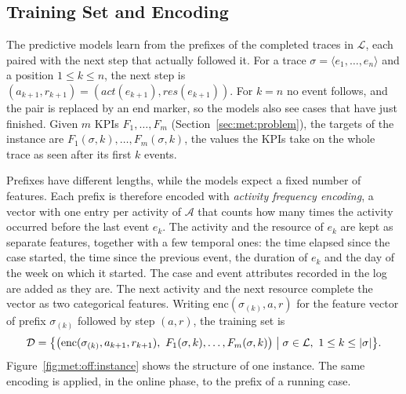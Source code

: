 \subsection{Training Set and Encoding}
\label{subsec:met:offline:training}
The predictive models learn from the prefixes of the completed traces in
$\mathcal{L}$, each paired with the next step that actually followed it. For
a trace $\sigma = \langle e_1, \dots, e_n \rangle$ and a position
$1 \le k \le n$, the next step is $(a_{k+1}, r_{k+1}) = (act(e_{k+1}),
res(e_{k+1}))$. For $k = n$ no event follows, and the pair is replaced by an
end marker, so the models also see cases that have just finished. Given $m$
KPIs $F_1, \dots, F_m$ (Section~\ref{sec:met:problem}), the targets of
the instance are $F_1(\sigma, k), \dots, F_m(\sigma, k)$, the values the KPIs
take on the whole trace as seen after its first $k$ events.

Prefixes have different lengths, while the models expect a fixed number of
features. Each prefix is therefore encoded with \emph{activity frequency
encoding}, a vector with one entry per activity of $\mathcal{A}$ that counts
how many times the activity occurred before the last event $e_k$. The
activity and the resource of $e_k$ are kept as separate features, together
with a few temporal ones: the time elapsed since the case started, the time
since the previous event, the duration of $e_k$ and the day of the week on
which it started. The case and event attributes recorded in the log are
added as they are. The next activity and the next resource complete the
vector as two categorical features. Writing $\mathrm{enc}(\sigma_{(k)}, a,
r)$ for the feature vector of prefix $\sigma_{(k)}$ followed by step
$(a, r)$, the training set is
\begin{equation}
  \mathcal{D} = \bigl\{ \bigl( \mathrm{enc}(\sigma_{(k)}, a_{k+1}, r_{k+1}),\
  F_1(\sigma, k), \dots, F_m(\sigma, k) \bigr) \bigm| \sigma \in \mathcal{L},\
  1 \le k \le |\sigma| \bigr\}.
  \label{eq:met:off:trainset}
\end{equation}
Figure~\ref{fig:met:off:instance} shows the structure of one instance. The
same encoding is applied, in the online phase, to the prefix of a running
case.

